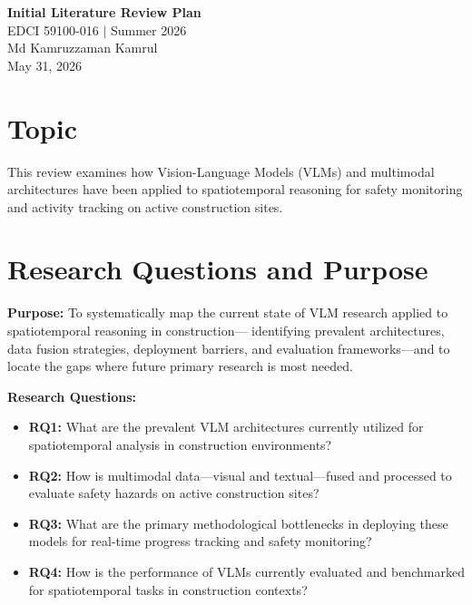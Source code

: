 \documentclass[12pt, letterpaper]{article}
\begin{document}

\begin{center}
  {\Large\bfseries Initial Literature Review Plan}\\[0.75em]
  {\normalsize EDCI 59100-016 $|$ Summer 2026}\\[0.25em]
  {\normalsize Md Kamruzzaman Kamrul}\\[0.25em]
  {\normalsize May 31, 2026}
\end{center}

\bigskip
\doublespacing

\section{Topic}

This review examines how Vision-Language Models (VLMs) and multimodal
architectures have been applied to spatiotemporal reasoning for safety
monitoring and activity tracking on active construction sites.

\section{Research Questions and Purpose}

\noindent\textbf{Purpose:} To systematically map the current state of
VLM research applied to spatiotemporal reasoning in construction---
identifying prevalent architectures, data fusion strategies, deployment
barriers, and evaluation frameworks---and to locate the gaps where future
primary research is most needed.

\noindent\textbf{Research Questions:}

\begin{itemize}[leftmargin=0.75in, label={}]
  \item \textbf{RQ1:} What are the prevalent VLM architectures currently
        utilized for spatiotemporal analysis in construction environments?
  \item \textbf{RQ2:} How is multimodal data---visual and textual---fused
        and processed to evaluate safety hazards on active construction sites?
  \item \textbf{RQ3:} What are the primary methodological bottlenecks in
        deploying these models for real-time progress tracking and safety
        monitoring?
  \item \textbf{RQ4:} How is the performance of VLMs currently evaluated and
        benchmarked for spatiotemporal tasks in construction contexts?
\end{itemize}
\end{document}
